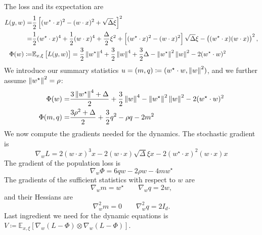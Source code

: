 The loss and its expectation are
\[\begin{split}
L(y,w) =& \frac{1}{2} \left[(w^\star \cdot x)^2 - (w \cdot x)^2 + \sqrt{\Delta} \xi\right]^2 \\
       =& \frac12 (w^\star \cdot x)^4 + \frac12 (w \cdot x)^4 + \frac\Delta2 \xi^2 + \left[(w^\star \cdot x)^2 - (w \cdot x)^2\right] \sqrt{\Delta}\xi - \left((w^\star \cdot x)(w \cdot x)\right)^2, \\
\Phi(w) \coloneqq& \mathbb E_{x,\xi} \left[L(y,w)\right] = \frac{3}{2}\left\lVert w^\star\right\rVert^4 + \frac{3}{2}\left\lVert w\right\rVert^4 +\frac32\Delta  - \left\lVert w^\star\right\rVert^2\left\lVert w\right\rVert^2 - 2(w^\star\cdot w)^2
\end{split}\]
We introduce our summary statistics \(u = (m,q) \coloneqq (w^\star \cdot w, \left\lVert w\right\rVert^2)\), and we further assume \(\left\lVert w^\star\right\rVert^2=\rho\):
\[ \begin{split}
    \Phi(w) =& \frac{3\left\lVert w^\star\right\rVert^4+\Delta}{2} + \frac{3}{2}\left\lVert w\right\rVert^4 - \left\lVert w^\star\right\rVert^2\left\lVert w\right\rVert^2 - 2(w^\star\cdot w)^2 \\
    \Phi(m,q) =& \frac{3\rho^2+\Delta}{2} + \frac32 q^2 - \rho q - 2m^2
\end{split}\]
We now compute the gradients needed for the dynamics. The stochastic gradient is
\[
    \nabla_w L = 2 (w \cdot x)^3 x  - 2(w \cdot x) \sqrt{\Delta}\xi x - 2(w^\star \cdot x)^2(w \cdot x) x
\]
The gradient of the population loss is
\[
    \nabla_w\Phi = 6qw-2\rho w-4mw^\star
\]
The gradients of the sufficient statistics with respect to \(w\) are
\[
    \nabla_w m = w^\star \qquad \nabla_w q = 2w,
\]
and their Hessians are
\[
    \nabla^2_w m = 0 \qquad \nabla^2_w q = 2I_d.
\]
Last ingredient we need for the dynamic equations is \(V\coloneqq \mathbb E_{x,\xi} \left[\nabla_w(L-\Phi)\otimes\nabla_w(L-\Phi)\right]\).

